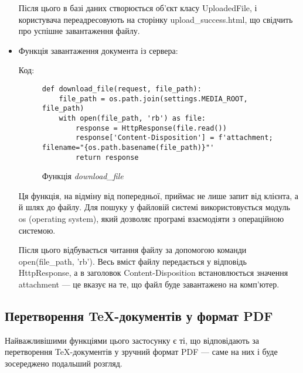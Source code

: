 \documentclass[a4paper,14pt]{extarticle}
\numberwithin{figure}{section}
\begin{document}
\begin{itemize}
    Після цього в базі даних створюється об’єкт класу UploadedFile, і користувача переадресовують на сторінку upload\_success.html, що свідчить про успішне завантаження файлу.

    \item Функція завантаження документа із сервера:

    Код:
    \begin{figure}[h]
    \centering
    \begin{lstlisting}[style=mystyle]
    def download_file(request, file_path):
    file_path = os.path.join(settings.MEDIA_ROOT, file_path)
    with open(file_path, 'rb') as file:
        response = HttpResponse(file.read())
        response['Content-Disposition'] = f'attachment; filename="{os.path.basename(file_path)}"'
        return response
    \end{lstlisting}
    \caption{\normalsize Функція \textit{download\_file}}
    \end{figure}
    

    Ця функція, на відміну від попередньої, приймає не лише запит від клієнта, а й шлях до файлу. Для пошуку у файловій системі використовується модуль os (operating system), який дозволяє програмі взаємодіяти з операційною системою. 
    
    Після цього відбувається читання файлу за допомогою команди open(file\_path, 'rb'). Весь вміст файлу передається у відповідь HttpResponse, а в заголовок Content-Disposition встановлюється значення attachment — це вказує на те, що файл буде завантажено на комп’ютер.
    \end{itemize}
    \newpage
    \subsection{\large Перетворення TeX-документів у формат PDF}

    Найважливішими функціями цього застосунку є ті, що відповідають за перетворення TeX-документів у зручний формат PDF --- саме на них і буде зосереджено подальший розгляд.
\end{document}
